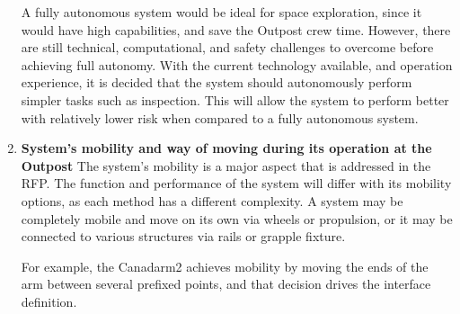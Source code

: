 \documentclass[12pt, letter]{article}
\begin{document}
\begin{enumerate}
{\begin{table}[H]
\begin{tabular}{|P{2.2cm}|P{3.5cm}|P{3.5cm}|P{3.5cm}|l|}
\end{tabular}
\end{table}
A fully autonomous system would be ideal for space exploration, since it would have high capabilities, and save the Outpost crew time.\cite{rob_sys} However, there are still technical, computational, and safety challenges to overcome before achieving full autonomy. With the current technology available, and operation experience, it is decided that the system should autonomously perform simpler tasks such as inspection. This will allow the system to perform better with relatively lower risk when compared to a fully autonomous system.}
\item{\textbf{System's mobility and way of moving during its operation at the Outpost}
The system's mobility is a major aspect that is addressed in the RFP.\cite{RFP} The function and performance of the system will differ with its mobility options, as each method has a different complexity. A system may be completely mobile and move on its own via wheels or propulsion, or it may be connected to various structures via rails or grapple fixture.

For example, the Canadarm2 achieves mobility by moving the ends of the arm between several prefixed points, and that decision drives the interface definition.\cite{ISS_ass} 

}
\end{enumerate}
\end{document}
